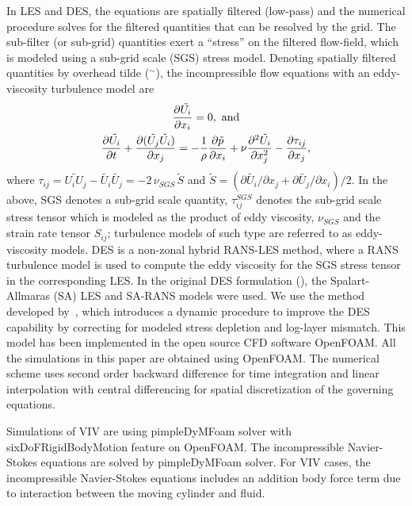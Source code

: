 \documentclass[12pt,authoryear]{elsarticle}
\begin{document}
In LES and DES, the equations are spatially filtered (low-pass) and the
numerical procedure solves for the filtered quantities that can be resolved by
the grid. The sub-filter (or sub-grid) quantities exert a ``stress'' on the
filtered flow-field, which is modeled using a sub-grid scale (SGS) stress
model. Denoting spatially filtered quantities by overhead tilde ($^\sim$), the
incompressible flow equations with an eddy-viscosity turbulence model are
%
\begin{gather*}
  \frac{\partial{\tilde{U_i}}}{\partial{x_i}}=0,~{\rm and} \\
   \frac{\partial{\tilde{U_i}}}{\partial{t}}+
   \frac{\partial{(\tilde{U_j}\tilde{U_i})}}{\partial{x_j}}
   =-\frac{1}{\rho}\frac{\partial{\tilde{p}}}{\partial{x_i}}+\nu\frac{\partial{^2\tilde{U_i}}}{\partial{x_j^2}}-\frac{\partial{\tau_{ij}}}{\partial{x_j}}, \\
 \label{eq:geqs}
\end{gather*}
%
where $\tau_{ij} = \widetilde{U_i U_j}-\tilde{U_i}\tilde{U_j} = -2 \, \nu_{SGS}
\, \tilde{S}$ and $\tilde{S} = (\partial{\tilde{U_i}}/\partial{x_j} +
\partial{\tilde{U_j}}/\partial{x_i})/2$.  In the above, SGS denotes a sub-grid
scale quantity, $\tau_{ij}^{SGS}$ denotes the sub-grid scale stress tensor
which is modeled as the product of eddy viscosity, $\nu_{SGS}$ and the strain
rate tensor $S_{ij}$; turbulence models of such type are referred to as
eddy-viscosity models. DES is a non-zonal hybrid RANS-LES method, where a RANS
turbulence model is used to compute the eddy viscosity for the SGS stress
tensor in the corresponding LES. In the original DES formulation
(\cite{spalart1997comments}), the Spalart-Allmaras (SA) LES and SA-RANS models
were used. We use the method developed by~\cite{yin2015dynamic}, which
introduces a dynamic procedure to improve the DES capability by correcting for
modeled stress depletion and log-layer mismatch. This model has been
implemented in the open source CFD software OpenFOAM. All the simulations in
this paper are obtained using OpenFOAM. The numerical scheme uses second order
backward difference for time integration and linear interpolation with central
differencing for spatial discretization of the governing equations.

Simulations of VIV are using pimpleDyMFoam solver with sixDoFRigidBodyMotion
feature on OpenFOAM. The incompressible Navier-Stokes equations are solved by
pimpleDyMFoam solver. For VIV cases, the incompressible Navier-Stokes equations
includes an addition body force term due to interaction between the moving
cylinder and fluid. 
\end{document}
